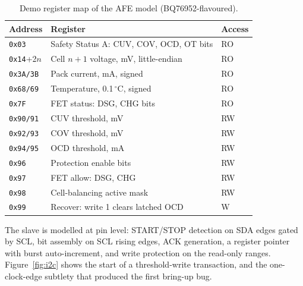 \documentclass[11pt]{article}
\newcommand{\reg}[1]{\texttt{#1}}
\begin{document}
\begin{table}[htbp]
\centering\small
\begin{tabular}{@{}lll@{}}
\toprule
Address & Register & Access \\
\midrule
\reg{0x03}        & Safety Status A: CUV, COV, OCD, OT bits & RO \\
\reg{0x14}+2$n$   & Cell $n{+}1$ voltage, mV, little-endian & RO \\
\reg{0x3A/3B}     & Pack current, mA, signed                & RO \\
\reg{0x68/69}     & Temperature, 0.1\,$^\circ$C, signed     & RO \\
\reg{0x7F}        & FET status: DSG, CHG bits               & RO \\
\reg{0x90/91}     & CUV threshold, mV                       & RW \\
\reg{0x92/93}     & COV threshold, mV                       & RW \\
\reg{0x94/95}     & OCD threshold, mA                       & RW \\
\reg{0x96}        & Protection enable bits                  & RW \\
\reg{0x97}        & FET allow: DSG, CHG                     & RW \\
\reg{0x98}        & Cell-balancing active mask              & RW \\
\reg{0x99}        & Recover: write 1 clears latched OCD     & W  \\
\bottomrule
\end{tabular}
\caption{Demo register map of the AFE model (BQ76952-flavoured).}
\label{tab:regmap}
\end{table}

The slave is modelled at pin level: START/STOP detection on SDA edges
gated by SCL, bit assembly on SCL rising edges, ACK generation, a
register pointer with burst auto-increment, and write protection on
the read-only ranges.  Figure~\ref{fig:i2c} shows the start of a
threshold-write transaction, and the one-clock-edge subtlety that
produced the first bring-up bug.
\end{document}
